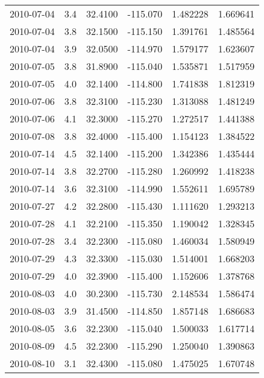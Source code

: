\begin{tabular}{lrrrrr}
2010-07-04 &       3.4 &  32.4100 &  -115.070 &         1.482228 &         1.669641 \\
2010-07-04 &       3.8 &  32.1500 &  -115.150 &         1.391761 &         1.485564 \\
2010-07-04 &       3.9 &  32.0500 &  -114.970 &         1.579177 &         1.623607 \\
2010-07-05 &       3.8 &  31.8900 &  -115.040 &         1.535871 &         1.517959 \\
2010-07-05 &       4.0 &  32.1400 &  -114.800 &         1.741838 &         1.812319 \\
2010-07-06 &       3.8 &  32.3100 &  -115.230 &         1.313088 &         1.481249 \\
2010-07-06 &       4.1 &  32.3000 &  -115.270 &         1.272517 &         1.441388 \\
2010-07-08 &       3.8 &  32.4000 &  -115.400 &         1.154123 &         1.384522 \\
2010-07-14 &       4.5 &  32.1400 &  -115.200 &         1.342386 &         1.435444 \\
2010-07-14 &       3.8 &  32.2700 &  -115.280 &         1.260992 &         1.418238 \\
2010-07-14 &       3.6 &  32.3100 &  -114.990 &         1.552611 &         1.695789 \\
2010-07-27 &       4.2 &  32.2800 &  -115.430 &         1.111620 &         1.293213 \\
2010-07-28 &       4.1 &  32.2100 &  -115.350 &         1.190042 &         1.328345 \\
2010-07-28 &       3.4 &  32.2300 &  -115.080 &         1.460034 &         1.580949 \\
2010-07-29 &       4.3 &  32.3300 &  -115.030 &         1.514001 &         1.668203 \\
2010-07-29 &       4.0 &  32.3900 &  -115.400 &         1.152606 &         1.378768 \\
2010-08-03 &       4.0 &  30.2300 &  -115.730 &         2.148534 &         1.586474 \\
2010-08-03 &       3.9 &  31.4500 &  -114.850 &         1.857148 &         1.686683 \\
2010-08-05 &       3.6 &  32.2300 &  -115.040 &         1.500033 &         1.617714 \\
2010-08-09 &       4.5 &  32.2300 &  -115.290 &         1.250040 &         1.390863 \\
2010-08-10 &       3.1 &  32.4300 &  -115.080 &         1.475025 &         1.670748 \\

\end{tabular}
